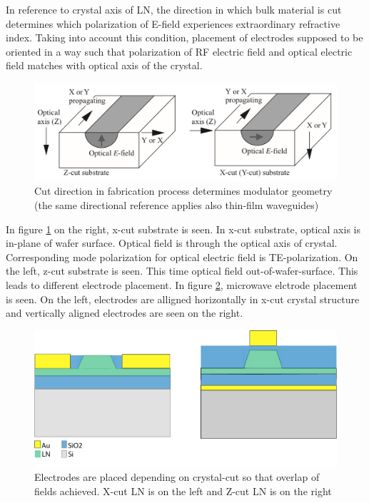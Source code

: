\documentclass[thesis]{deutez}
\begin{document}
    In reference to crystal axis of LN, the direction in which bulk material is cut determines which polarization of E-field experiences extraordinary refractive index. Taking into account this condition, placement of electrodes supposed to be oriented in a way such that polarization of RF electric field and optical electric field matches with optical axis of the crystal.

    \begin{figure}[h]
        \centering
        \includegraphics[width=0.8\linewidth]{modulator-orientation.jpeg}
        \caption{Cut direction in fabrication process determines modulator geometry\cite{16} (the same directional reference applies also thin-film waveguides)}
        \label{fig:waveguide-orientation}
    \end{figure}
    
    In figure \ref{fig:waveguide-orientation} on the right, x-cut substrate is seen. In x-cut substrate, optical axis is in-plane of wafer surface. Optical field is through the optical axis of crystal. Corresponding mode polarization for optical electric field is TE-polarization. On the left, z-cut substrate is seen. This time optical field out-of-wafer-surface. This leads to different electrode placement. In figure \ref{fig:electrode-placement}, microwave elctrode placement is seen. On the left, electrodes are alligned horizontally in x-cut crystal structure and vertically aligned electrodes are seen on the right.

    \begin{figure}
        \centering
        \includegraphics[width=0.9\linewidth]{x-cut-LNOI.png}
        \caption{Electrodes are placed depending on crystal-cut so that overlap of fields achieved. X-cut LN is on the left and Z-cut LN is on the right }
        \label{fig:electrode-placement}
    \end{figure}
 
\end{document}
